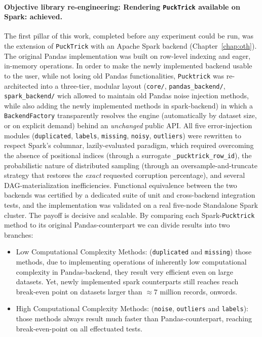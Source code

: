 \documentclass[../main.tex]{subfiles}
\begin{document}
\paragraph{Objective library re-engineering: Rendering \texttt{PuckTrick} available on Spark: achieved.\newline}
The first pillar of this work, completed before any experiment could be run, was the extension of \texttt{PuckTrick} with an Apache Spark backend (Chapter~\ref{chap:oth}). The original Pandas implementation was built on row-level indexing and eager, in-memory operations. In order to make the newly implemented backend usable to the user, while not losing old Pandas functionalities, \texttt{Pucktrick} was re-architected into a three-tier, modular layout (\texttt{core/}, \texttt{pandas\_backend/}, \texttt{spark\_backend/} wich allowed to maintain old Pandas noise injection methods, while also adding the newly implemented methods in spark-backend) in which a \texttt{BackendFactory} transparently resolves the engine (automatically by dataset size, or on explicit demand) behind an \emph{unchanged} public API. All five error-injection modules (\texttt{duplicated}, \texttt{labels}, \texttt{missing}, \texttt{noisy}, \texttt{outliers}) were rewritten to respect Spark's columnar, lazily-evaluated paradigm, which required overcoming the absence of positional indices (through a surrogate \texttt{\_pucktrick\_row\_id}), the probabilistic nature of distributed sampling (through an oversample-and-truncate strategy that restores the \emph{exact} requested corruption percentage), and several DAG-materialization inefficiencies. Functional equivalence between the two backends was certified by a dedicated suite of unit and cross-backend integration tests, and the implementation was validated on a real five-node Standalone Spark cluster. The payoff is decisive and scalable. By comparing each Spark-\texttt{Pucktrick} method to its original Pandas-counterpart we can divide results into two branches:
\begin{itemize}
    \item Low Computational Complexity Methods: (\texttt{duplicated} and \texttt{missing}) those methods, due to implementing operations of inherently low computational complexity in Pandas-backend, they result very efficient even on large datasets. Yet, newly implemented spark counterparts still reaches reach break-even point on datasets larger than $\approx7$ million records, onwords.
    \item High Computational Complexity Methods: (\texttt{noise}, \texttt{outliers} and \texttt{labels}): those methods always result much faster than Pandas-counterpart, reaching break-even-point on all effectuated tests.
\end{itemize}
\end{document}
